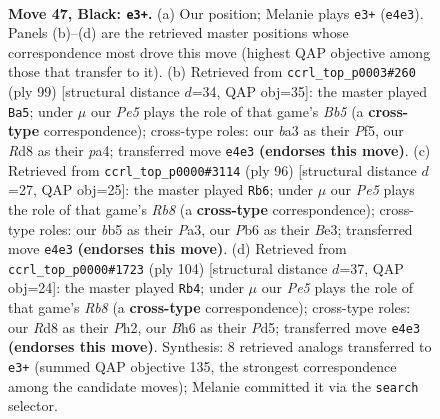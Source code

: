 \documentclass[11pt]{article}
\begin{document}
\clearpage

\begin{figure}[p]\centering
\begin{subfigure}{0.46\textwidth}\centering
\resizebox{\linewidth}{!}{%
\newchessgame
\chessboard[
  setfen={1k1r4/p7/PpR3nb/1B3p2/4pP2/B7/5K2/8 b - - 27 47},
  showmover=false,
  pgfstyle=straightmove, color=movearrow, markmove={e4-e3}
]}
\caption{}
\end{subfigure}\hfill
\begin{subfigure}{0.46\textwidth}\centering
\resizebox{\linewidth}{!}{%
\newchessgame
\chessboard[
  setfen={8/2R2n1p/4k1pP/5p2/Pb1B1P2/1p2P3/1K6/8 b - - 2 50},
  showmover=false,
  pgfstyle=straightmove, color=movearrow, markmove={b4-a5}
]}
\caption{}
\end{subfigure}
\\[4pt]
\begin{subfigure}{0.46\textwidth}\centering
\resizebox{\linewidth}{!}{%
\newchessgame
\chessboard[
  setfen={1R6/5k2/2b5/4p1p1/p5P1/P2rBP2/1P3K2/8 w - - 10 49},
  showmover=false,
  pgfstyle=straightmove, color=movearrow, markmove={b8-b6}
]}
\caption{}
\end{subfigure}\hfill
\begin{subfigure}{0.46\textwidth}\centering
\resizebox{\linewidth}{!}{%
\newchessgame
\chessboard[
  setfen={1R3b2/5k1p/3p4/3PpN2/4Pr2/7K/7P/8 w - - 7 53},
  showmover=false,
  pgfstyle=straightmove, color=movearrow, markmove={b8-b4}
]}
\caption{}
\end{subfigure}
\caption{\textbf{Move 47, Black: \texttt{e3+}.} (a) Our position; Melanie plays \texttt{e3+} (\texttt{e4e3}). Panels (b)--(d) are the retrieved master positions whose correspondence most drove this move (highest QAP objective among those that transfer to it). (b) Retrieved from \texttt{ccrl\_top\_p0003\#260} (ply 99) [structural distance $d$=34, QAP obj=35]: the master played \texttt{Ba5}; under $\mu$ our \emph{Pe5} plays the role of that game's \emph{Bb5} (a \textbf{cross-type} correspondence); cross-type roles: our \emph{b}a3 as their \emph{P}f5, our \emph{R}d8 as their \emph{p}a4; transferred move \texttt{e4e3} \textbf{(endorses this move)}. (c) Retrieved from \texttt{ccrl\_top\_p0000\#3114} (ply 96) [structural distance $d$=27, QAP obj=25]: the master played \texttt{Rb6}; under $\mu$ our \emph{Pe5} plays the role of that game's \emph{Rb8} (a \textbf{cross-type} correspondence); cross-type roles: our \emph{b}b5 as their \emph{P}a3, our \emph{P}b6 as their \emph{B}e3; transferred move \texttt{e4e3} \textbf{(endorses this move)}. (d) Retrieved from \texttt{ccrl\_top\_p0000\#1723} (ply 104) [structural distance $d$=37, QAP obj=24]: the master played \texttt{Rb4}; under $\mu$ our \emph{Pe5} plays the role of that game's \emph{Rb8} (a \textbf{cross-type} correspondence); cross-type roles: our \emph{R}d8 as their \emph{P}h2, our \emph{B}h6 as their \emph{P}d5; transferred move \texttt{e4e3} \textbf{(endorses this move)}. Synthesis: 8 retrieved analogs transferred to \texttt{e3+} (summed QAP objective 135, the strongest correspondence among the candidate moves); Melanie committed it via the \texttt{search} selector.}
\label{fig:thought-m93}
\end{figure}
\end{document}
